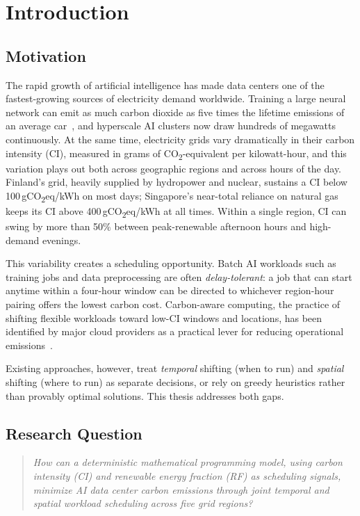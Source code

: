 \section{Introduction}

\subsection{Motivation}

The rapid growth of artificial intelligence has made data centers one of the fastest-growing sources of electricity demand worldwide.
Training a large neural network can emit as much carbon dioxide as five times the lifetime emissions of an average car~\cite{strubell2019energy}, and hyperscale AI clusters now draw hundreds of megawatts continuously.
At the same time, electricity grids vary dramatically in their carbon intensity (CI), measured in grams of CO\textsubscript{2}-equivalent per kilowatt-hour, and this variation plays out both across geographic regions and across hours of the day.
Finland's grid, heavily supplied by hydropower and nuclear, sustains a CI below 100\,gCO\textsubscript{2}eq/kWh on most days; Singapore's near-total reliance on natural gas keeps its CI above 400\,gCO\textsubscript{2}eq/kWh at all times.
Within a single region, CI can swing by more than 50\% between peak-renewable afternoon hours and high-demand evenings.

This variability creates a scheduling opportunity.
Batch AI workloads such as training jobs and data preprocessing are often \emph{delay-tolerant}: a job that can start anytime within a four-hour window can be directed to whichever region-hour pairing offers the lowest carbon cost.
Carbon-aware computing, the practice of shifting flexible workloads toward low-CI windows and locations, has been identified by major cloud providers as a practical lever for reducing operational emissions~\cite{radovanovic2023}.

Existing approaches, however, treat \emph{temporal} shifting (when to run) and \emph{spatial} shifting (where to run) as separate decisions, or rely on greedy heuristics rather than provably optimal solutions.
This thesis addresses both gaps.

\subsection{Research Question}

\begin{quote}
\textit{How can a deterministic mathematical programming model, using carbon intensity (CI) and renewable energy fraction (RF) as scheduling signals, minimize AI data center carbon emissions through joint temporal and spatial workload scheduling across five grid regions?}
\end{quote}

